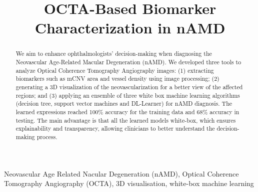 \documentclass[conference]{IEEEtran}
\begin{document}
\newcommand{\nb}[2]{
    \fbox{\bfseries\sffamily\scriptsize#1}
    {\sf\small\textcolor{red}{\textit{#2}}}
}
\newcommand\ag[1]{\nb{AG}{#1}}
\newcommand\ts[1]{\nb{ST}{#1}}


\title{OCTA-Based Biomarker Characterization in nAMD}

\author{
}

\maketitle

\begin{abstract}
We aim to enhance ophthalmologists' decision-making when diagnosing the Neovascular Age-Related Macular Degeneration (nAMD). 
We developed three tools to analyze Optical Coherence Tomography Angiography images: (1) extracting biomarkers such as mCNV area and vessel density using image processing; (2) generating a 3D visualization of the neovascularization for a better view of the affected regions; and (3) applying an ensemble of three white box machine learning algorithms (decision tree, support vector machines and DL-Learner) for nAMD diagnosis. The learned expressions reached 100\% accuracy for the training data and 68\% accuracy in testing. The main advantage is that all the learned models white-box, which ensures explainability and transparency, allowing clinicians to better understand the decision-making process.
\end{abstract}


\begin{IEEEkeywords}
Neovascular Age Related Nacular Degeneration (nAMD), Optical Coherence Tomography Angiography (OCTA), 3D visualisation, %
white-box machine learning
\end{IEEEkeywords}
\end{document}
